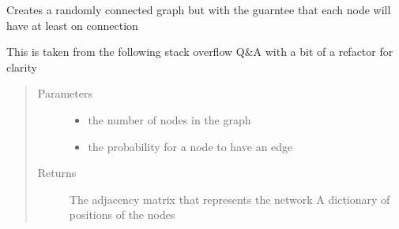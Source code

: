 \documentclass[letterpaper,10pt,english]{sphinxmanual}
\begin{document}
\begin{fulllineitems}
\label{\detokenize{source/yawning_titan.envs.generic.helpers:yawning_titan.envs.generic.helpers.network_creator.gnp_random_connected_graph}}
\sphinxAtStartPar
Creates a randomly connected graph but with the guarntee that
each node will have at least on connection

\sphinxAtStartPar
This is taken from the following stack overflow Q\&A with a bit of a refactor
for clarity
\begin{quote}\begin{description}
\item[{Parameters}] \leavevmode\begin{itemize}
\item {}
\sphinxAtStartPar
{} \textendash{} the number of nodes in the graph

\item {}
\sphinxAtStartPar
{} \textendash{} the probability for a node to have an edge

\end{itemize}

\item[{Returns}] \leavevmode
\sphinxAtStartPar
The adjacency matrix that represents the network
A dictionary of positions of the nodes

\end{description}\end{quote}

\end{fulllineitems}
\end{document}
